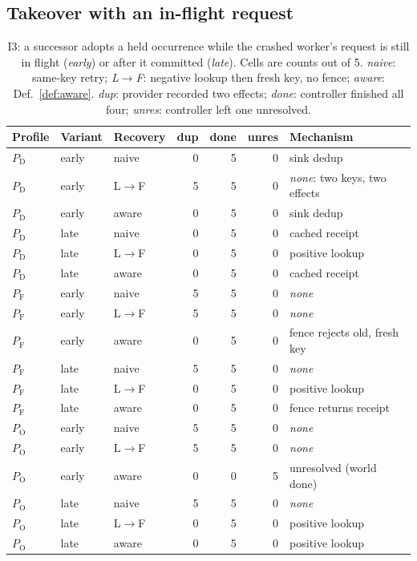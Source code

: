 \documentclass[conference,10pt]{IEEEtran}
\newcommand{\PD}{P_{\mathrm{D}}}
\newcommand{\PF}{P_{\mathrm{F}}}
\newcommand{\PO}{P_{\mathrm{O}}}
\begin{document}
\subsection{Takeover with an in-flight request}\label{sec:results-i3}
\begin{table}[t]
\centering\footnotesize
\caption{I3: a successor adopts a held occurrence while the crashed worker's request is still in flight (\emph{early}) or after it committed (\emph{late}). Cells are counts out of 5. \emph{naive}: same-key retry; \emph{L$\to$F}: negative lookup then fresh key, no fence; \emph{aware}: Def.~\ref{def:aware}. \emph{dup}: provider recorded two effects; \emph{done}: controller finished all four; \emph{unres}: controller left one unresolved.}
\label{tab:i3}
\setlength{\tabcolsep}{2.5pt}
\begin{tabular}{@{}lllrrrl@{}}
\toprule
Profile & Variant & Recovery & dup & done & unres & Mechanism\\
\midrule
$\PD$ & early & naive & 0 & 5 & 0 & sink dedup\\
$\PD$ & early & L$\to$F & 5 & 5 & 0 & \emph{none}: two keys, two effects\\
$\PD$ & early & aware & 0 & 5 & 0 & sink dedup\\
$\PD$ & late & naive & 0 & 5 & 0 & cached receipt\\
$\PD$ & late & L$\to$F & 0 & 5 & 0 & positive lookup\\
$\PD$ & late & aware & 0 & 5 & 0 & cached receipt\\
$\PF$ & early & naive & 5 & 5 & 0 & \emph{none}\\
$\PF$ & early & L$\to$F & 5 & 5 & 0 & \emph{none}\\
$\PF$ & early & aware & 0 & 5 & 0 & fence rejects old, fresh key\\
$\PF$ & late & naive & 5 & 5 & 0 & \emph{none}\\
$\PF$ & late & L$\to$F & 0 & 5 & 0 & positive lookup\\
$\PF$ & late & aware & 0 & 5 & 0 & fence returns receipt\\
$\PO$ & early & naive & 5 & 5 & 0 & \emph{none}\\
$\PO$ & early & L$\to$F & 5 & 5 & 0 & \emph{none}\\
$\PO$ & early & aware & 0 & 0 & 5 & unresolved (world done)\\
$\PO$ & late & naive & 5 & 5 & 0 & \emph{none}\\
$\PO$ & late & L$\to$F & 0 & 5 & 0 & positive lookup\\
$\PO$ & late & aware & 0 & 5 & 0 & positive lookup\\
\bottomrule
\end{tabular}
\end{table}
\end{document}
